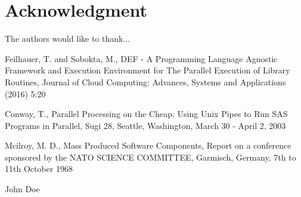 \documentclass[conference]{IEEEtran}
\begin{document}
\section*{Acknowledgment}
The authors would like to thank...

\ifCLASSOPTIONcaptionsoff
  \newpage
\fi

\begin{thebibliography}{1}

Feilhauer, T. and Sobokta, M., DEF - A Programming Language Agnostic Framework and Execution Environment for The Parallel Execution of Library Routines, Journal of Cloud Computing: Advances, Systems and Applications (2016) 5:20

Conway, T., Parallel Processing on the Cheap: Using Unix Pipes to Run SAS Programs in Parallel, Sugi 28, Seattle, Washington, March 30 - April 2, 2003 

Mcilroy, M. D., Mass Produced Software Components, Report on a conference sponsored by the NATO SCIENCE COMMITTEE, Garmisch, Germany, 7th to 11th October 1968



\end{thebibliography}

\begin{IEEEbiography}{John Doe}
\blindtext
\end{IEEEbiography}



\end{document}
